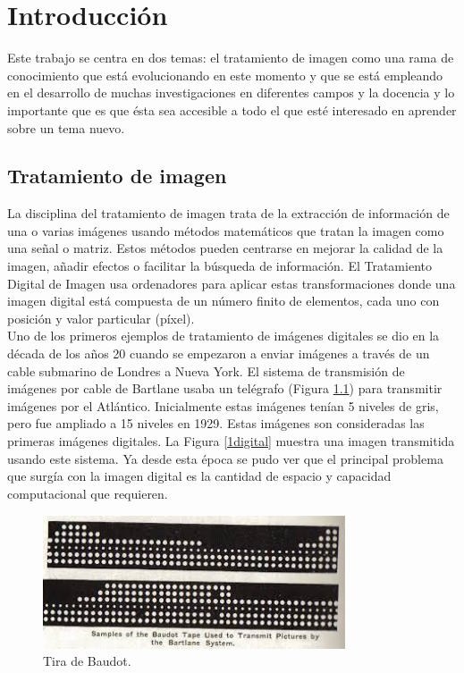 \chapter{Introducción}

Este trabajo se centra en dos temas: el tratamiento de imagen como una rama de conocimiento que está evolucionando en este momento y que se está empleando en el desarrollo de muchas investigaciones en diferentes campos y la docencia y lo importante que es que ésta sea accesible a todo el que esté interesado en aprender sobre un tema nuevo.\\

\section{Tratamiento de imagen}

La disciplina del tratamiento de imagen trata de la extracción de información de una o varias imágenes usando métodos matemáticos que tratan la imagen como una señal o matriz. Estos métodos pueden centrarse en mejorar la calidad de la imagen, añadir efectos o facilitar la búsqueda de información. El Tratamiento Digital de Imagen usa ordenadores para aplicar estas transformaciones donde una imagen digital está compuesta de un número finito de elementos, cada uno con posición y valor particular (píxel)\cite{Historia2}.\\

Uno de los primeros ejemplos de tratamiento de imágenes digitales se dio en la década de los años 20 cuando se empezaron a enviar imágenes a través de un cable submarino de Londres a Nueva York. El sistema de transmisión de imágenes por cable de Bartlane usaba un telégrafo (Figura \ref{telegrafo}) para transmitir imágenes por el Atlántico\cite{Historia3}. Inicialmente estas imágenes tenían 5 niveles de gris, pero fue ampliado a 15 niveles en 1929. Estas imágenes son consideradas las primeras imágenes digitales. La Figura \ref{1digital} muestra una imagen transmitida usando este sistema. Ya desde esta época se pudo ver que el principal problema que surgía con la imagen digital es la cantidad de espacio y capacidad computacional que requieren.\\

\begin{figure}[h]
\centering
\includegraphics[width=0.8\textwidth]{imagenes/telegrafo}
\caption{Tira de Baudot.}
\label{telegrafo}
\end{figure}

